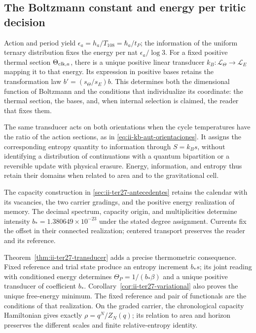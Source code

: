 \subsection{The Boltzmann constant and energy per tritic decision}

Action and period yield
\(\epsilon_a=h_a/T_{108}=\hbar_a/t_P\); the information of the
uniform ternary distribution fixes the energy per nat \(\epsilon_a/\log3\).
For a fixed positive thermal section \(\Theta_{{\rm clk},a}\),
there is a unique positive linear transducer
\(k_B:\mathcal L_\Theta\to\mathcal L_E\) mapping it to that
energy. Its expression in positive bases retains the transformation
law \(b'=(s_\Theta/s_E)b\). This determines both the dimensional
function of Boltzmann and the conditions that individualize its
coordinate: the thermal section, the bases, and, when internal
selection is claimed, the reader that fixes them.

The same transducer acts on both orientations when the cycle
temperatures have the ratio of the action sections,
as in \eqref{eq:ii-kb-aut-orientaciones}. It assigns the corresponding
entropy quantity to information through \(S=k_Bs\), without identifying a
distribution of continuations with a quantum bipartition or a
reversible update with physical erasure. Energy, information, and
entropy thus retain their domains when related to area and to the
gravitational cell.

The capacity construction in \ref{sec:ii-ter27-antecedentes} retains the
calendar with its vacancies, the two carrier gradings, and the positive
energy realization of memory. The decimal spectrum, capacity origin,
and multiplicities determine intensity \(b_*=1.380649\times10^{-23}\)
under the stated degree assignment. Currents fix the offset in their
connected realization; centered transport preserves the reader and its
reference.

Theorem~\ref{thm:ii-ter27-transducer} adds a precise thermometric
consequence. Fixed reference and trial state produce an entropy increment
\(b_*s\); its joint reading with conditioned energy determines
\(\Theta_P=1/(b_*\beta)\) and a unique positive transducer of coefficient
\(b_*\). Corollary~\ref{cor:ii-ter27-variational} also proves the unique
free-energy minimum. The fixed reference and pair of functionals are
the conditions of that realization. On the graded carrier, the
chronological capacity Hamiltonian gives exactly
\(\rho=q^N/Z_N(q)\); its relation to area and horizon preserves
the different scales and finite relative-entropy identity.

